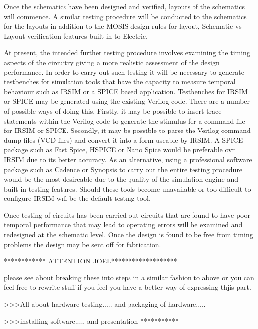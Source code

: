 Once the schematics have been designed and verified, layouts of the schematics will commence. A similar testing procedure will be conducted to the schematics for the layouts in addition to the MOSIS design rules for layout, Schematic vs Layout verification features built-in to Electric.

At present, the intended further testing procedure involves examining the timing aspects of the circuitry giving a more realistic assessment of the design performance. In order to carry out such testing it will be necessary to generate testbenches for simulation tools that have the capacity to measure temporal behaviour such as IRSIM or a SPICE based application. Testbenches for IRSIM or SPICE may be generated using the existing Verilog code. There are a number of possible ways of doing this. Firstly, it may be possible to insert trace statements within the Verilog code to generate the stimulus for a command file for IRSIM or SPICE. Secondly, it may be possible to parse the Verilog command dump files (VCD files) and convert it into a form useable by IRSIM. A SPICE package such as Fast Spice, HSPICE or Nano Spice would be preferable ovr IRSIM due to its better accuracy. As an alternative, using a professional software package such as Cadence or Synopsis to carry out the entire testing procedure would be the most desireable due to the quality of the simulation engine and built in testing features. Should these tools become unavailable or too difficult to configure IRSIM will be the default testing tool.

Once testing of circuits has been carried out circuits that are found to have poor temporal performance that may lead to operating errors will be examined and redesigned at the schematic level. Once the design is found to be free from timing problems the design may  be sent off for fabrication.

************ ATTENTION JOEL*******************

please see about breaking these into steps in a similar fashion to above or you can feel free to rewrite stuff if you feel you have a better way of expressing thjis part.

>>>All about hardware testing..... and packaging of hardware.....

>>>installing software..... and presentation
***********

